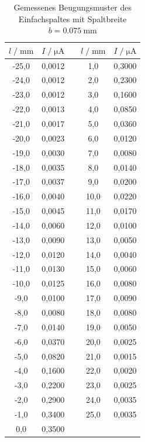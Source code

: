 \begin{table}
        \centering
        \caption{Gemessenes Beugungsmuster des Einfachspaltes mit Spaltbreite $b = \SI{0.075}{\milli\meter}$}
        \label{tab:mess2}
        \begin{tabular}{c c c c c}
        \toprule
        $ l \;/\; \si{\milli\meter} $ & $I \;/\; \si{\micro\ampere}$ & &
        $ l \;/\; \si{\milli\meter} $ & $I \;/\; \si{\micro\ampere}$ \\
        \midrule 
        -25,0 & 0,0012 & \; &  1,0 & 0,3000 \\
        -24,0 & 0,0012 & \; &  2,0 & 0,2300 \\
        -23,0 & 0,0012 & \; &  3,0 & 0,1600 \\
        -22,0 & 0,0013 & \; &  4,0 & 0,0850 \\
        -21,0 & 0,0017 & \; &  5,0 & 0,0360 \\
        -20,0 & 0,0023 & \; &  6,0 & 0,0120 \\
        -19,0 & 0,0030 & \; &  7,0 & 0,0080 \\
        -18,0 & 0,0035 & \; &  8,0 & 0,0140 \\
        -17,0 & 0,0037 & \; &  9,0 & 0,0200 \\
        -16,0 & 0,0040 & \; & 10,0 & 0,0220 \\
        -15,0 & 0,0045 & \; & 11,0 & 0,0170 \\
        -14,0 & 0,0060 & \; & 12,0 & 0,0100 \\
        -13,0 & 0,0090 & \; & 13,0 & 0,0050 \\
        -12,0 & 0,0120 & \; & 14,0 & 0,0040 \\
        -11,0 & 0,0130 & \; & 15,0 & 0,0060 \\
        -10,0 & 0,0125 & \; & 16,0 & 0,0080 \\
         -9,0 & 0,0100 & \; & 17,0 & 0,0090 \\
         -8,0 & 0,0080 & \; & 18,0 & 0,0080 \\
         -7,0 & 0,0140 & \; & 19,0 & 0,0050 \\
         -6,0 & 0,0370 & \; & 20,0 & 0,0025 \\
         -5,0 & 0,0820 & \; & 21,0 & 0,0015 \\
         -4,0 & 0,1600 & \; & 22,0 & 0,0020 \\
         -3,0 & 0,2200 & \; & 23,0 & 0,0025 \\
         -2,0 & 0,2900 & \; & 24,0 & 0,0035 \\
         -1,0 & 0,3400 & \; & 25,0 & 0,0035 \\
          0,0 & 0,3500 & \; & &  \\
        \bottomrule
        \end{tabular}
    \end{table}

